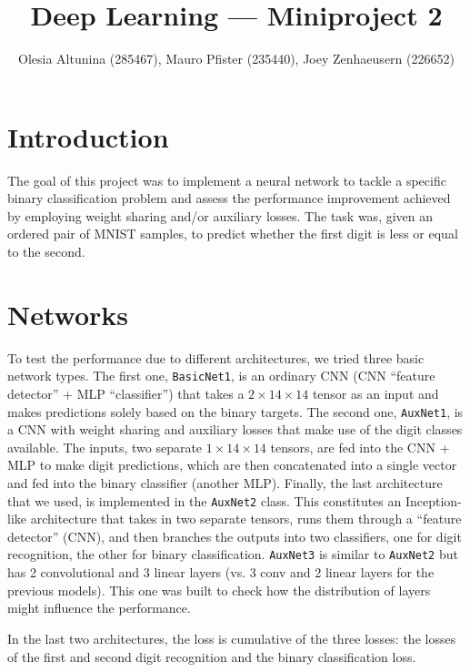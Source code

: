 \documentclass[10pt,conference,compsocconf]{IEEEtran}
\begin{document}
\title{Deep Learning --- Miniproject 2}

\author{
  Olesia Altunina (285467), Mauro Pfister (235440), Joey Zenhaeusern (226652)
}

\maketitle

\section{Introduction}
The goal of this project was to implement a neural network to tackle a specific binary classification problem and assess the performance improvement achieved by employing weight sharing and/or auxiliary losses. The task was, given an ordered pair of MNIST samples, to predict whether the first digit is less or equal to the second.

\section{Networks}
To test the performance due to different architectures, we tried three basic network types. The first one, \texttt{BasicNet1}, is an ordinary CNN (CNN “feature detector” + MLP “classifier”) that takes a \textit{$2 \times 14 \times 14$} tensor as an input and makes predictions solely based on the binary targets. The second one, \texttt{AuxNet1}, is a CNN with weight sharing and auxiliary losses that make use of the digit classes available. The inputs, two separate \textit{$1 \times 14 \times 14$} tensors, are fed into the CNN + MLP to make digit predictions, which are then concatenated into a single vector and fed into the binary classifier (another MLP). Finally, the last architecture that we used, is implemented in the \texttt{AuxNet2} class. This constitutes an Inception-like architecture that takes in two separate tensors, runs them through a “feature detector” (CNN), and then branches the outputs into two classifiers, one for digit recognition, the other for binary classification.
\texttt{AuxNet3} is similar to \texttt{AuxNet2} but has 2 convolutional and 3 linear layers (vs. 3 conv and 2 linear layers for the previous models). This one was built to check how the distribution of layers might influence the performance.

In the last two architectures, the loss is cumulative of the three losses: the losses of the first and second digit recognition and the binary classification loss.
\end{document}
